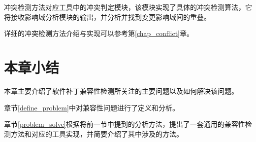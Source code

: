 冲突检测方法对应工具中的冲突判定模块，该模块实现了具体的冲突检测算法，它将接收影响域分析模块的输出，并分析并找到变更影响域间的重叠。

详细的冲突检测方法介绍与实现可以参考第\ref {chap_conflict}章。
%
%
%


%

%


\section{本章小结}
本章主要介绍了软件补丁兼容性检测所关注的主要问题以及如何解决该问题。

章节\ref {define_problem}中对兼容性问题进行了定义和分析。

章节\ref {problem_solve}根据将前一节中提到的分析方法，提出了一套通用的兼容性检测方法和对应的工具实现，并简要介绍了其中涉及的方法。